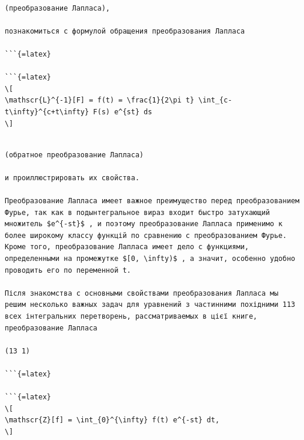 \documentclass[
]{article}
\begin{document}
\begin{verbatim}

(преобразование Лапласа),

познакомиться с формулой обращения преобразования Лапласа

```{=latex}

```{=latex}
\[
\mathscr{L}^{-1}[F] = f(t) = \frac{1}{2\pi t} \int_{c-t\infty}^{c+t\infty} F(s) e^{st} ds
\]
\end{verbatim}

\begin{verbatim}

(обратное преобразование Лапласа)

и проиллюстрировать их свойства.

Преобразование Лапласа имеет важное преимущество перед преобразованием Фурье, так как в подынтегральное вираз входит быстро затухающий множитель $e^{-st}$ , и поэтому преобразование Лапласа применимо к более широкому классу функцій по сравнению с преобразованием Фурье. Кроме того, преобразование Лапласа имеет дело с функциями, определенными на промежутке $[0, \infty)$ , а значит, особенно удобно проводить его по переменной t.

Після знакомства с основными свойствами преобразования Лапласа мы решим несколько важных задач для уравнений з частинними похідними 113 всех інтегральних перетворень, рассматриваемых в цієї книге, преобразование Лапласа

(13 1)

```{=latex}

```{=latex}
\[
\mathscr{Z}[f] = \int_{0}^{\infty} f(t) e^{-st} dt,
\]
\end{verbatim}
\end{document}
